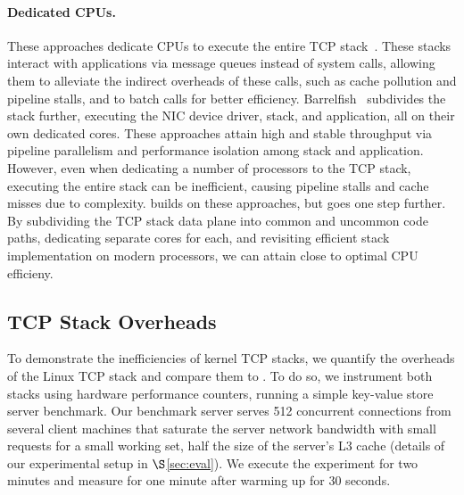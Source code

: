 \paragraph{Dedicated CPUs.} These approaches dedicate CPUs to execute
the entire TCP stack~\cite{onload, flexsc}. These stacks interact with
applications via message queues instead of system calls, allowing them
to alleviate the indirect overheads of these calls, such as cache
pollution and pipeline stalls, and to batch calls for better
efficiency. Barrelfish~\cite{barrelfish} subdivides the stack further,
executing the NIC device driver, stack, and application, all on their
own dedicated cores. These approaches attain high and stable
throughput via pipeline parallelism and performance isolation among
stack and application. However, even when dedicating a number of
processors to the TCP stack, executing the entire stack can be
inefficient, causing pipeline stalls and cache misses due to
complexity. \taas builds on these approaches, but goes one step
further. By subdividing the TCP stack data plane into common and
uncommon code paths, dedicating separate cores for each, and
revisiting efficient stack implementation on modern processors, we can
attain close to optimal CPU efficieny.

\subsection{TCP Stack Overheads}\label{sec:linux_overheads}

To demonstrate the inefficiencies of kernel TCP stacks, we quantify
the overheads of the Linux TCP stack and compare them to \taas. To do
so, we instrument both stacks using hardware performance counters,
running a simple key-value store server benchmark. Our benchmark
server serves 512 concurrent connections from several client machines
that saturate the server network bandwidth with small requests for a
small working set, half the size of the server's L3 cache (details of
our experimental setup in $\S$\ref{sec:eval}). We execute the
experiment for two minutes and measure for one minute after warming up
for 30 seconds.

